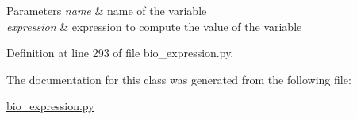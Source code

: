\begin{DoxyParams}{Parameters}
{\em name} & name of the variable \\
\hline
{\em expression} & expression to compute the value of the variable \\
\hline
\end{DoxyParams}


Definition at line 293 of file bio\+\_\+expression.\+py.



The documentation for this class was generated from the following file\+:\begin{DoxyCompactItemize}
\item 
\hyperlink{bio__expression_8py}{bio\+\_\+expression.\+py}\end{DoxyCompactItemize}
